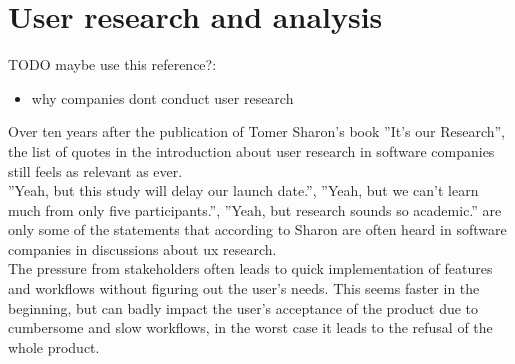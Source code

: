 %
\chapter{User research and analysis}
\label{chap:research}



TODO maybe use this reference?:
\begin{itemize}
  \item \cite{Ross:2016} why companies dont conduct user research
\end{itemize}

Over ten years after the publication of Tomer Sharon's book ''It's our Research'', the list of quotes in the introduction about user research in software companies still feels as relevant as ever.
\\
''Yeah, but this study will delay our launch date.'', ''Yeah, but we can't learn much from only five participants.'', ''Yeah, but research sounds so academic.'' \cite[p. 4]{Sharon:2012mk} are only some of the statements that according to Sharon are often heard in software companies in discussions about \Gls{ux} research.
\\
The pressure from stakeholders often leads to quick implementation of features and workflows without figuring out the user's needs.
This seems faster in the beginning, but can badly impact the user's acceptance of the product due to cumbersome and slow workflows,
in the worst case it leads to the refusal of the whole product.

